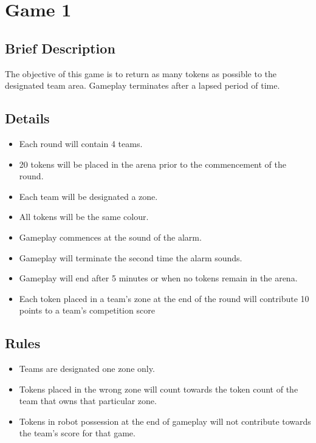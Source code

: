 \section {Game 1}

\subsection {Brief Description}

The objective of this game is to return as many tokens as possible to the designated team area. Gameplay terminates after a lapsed period of time.

\subsection {Details}

\begin {itemize}
\item {Each round will contain 4 teams.}
\item {20 tokens will be placed in the arena prior to the commencement of the round.}
\item {Each team will be designated a zone.}
\item {All tokens will be the same colour.}
\item {Gameplay commences at the sound of the alarm.}
\item {Gameplay will terminate the second time the alarm sounds.}
\item {Gameplay will end after 5 minutes or when no tokens remain in the arena.}\item {Each token placed in a team's zone at the end of the round will contribute 10 points to a team's competition score}
\end {itemize}

\subsection {Rules}

\begin {itemize}
\item Teams are designated one zone only.
\item Tokens placed in the wrong zone will count towards the token count of the team that owns that particular zone.
\item Tokens in robot possession at the end of gameplay will not contribute towards the team's score for that game.
\end {itemize}

